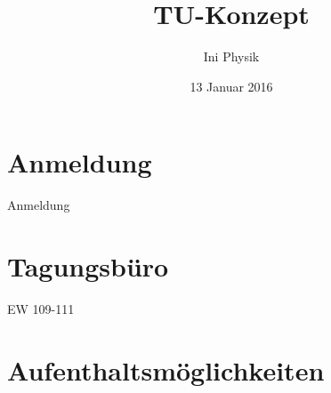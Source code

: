 \documentclass[compress,]{beamer}
\title[TU-Konzept]{TU-Konzept}
\author{Ini Physik}
\institute[TU Berlin]
\begin{document}
\subject{Konzept an der TU}
\date{13 Januar 2016}

\begin{frame}
\titlepage
\end{frame}


\frame{\tableofcontents}

\section{Anmeldung}
\begin{frame}{Anmeldung}
\end{frame}


\section{Tagungsbüro}
\begin{frame}{EW 109-111}
\end{frame}


\section{Aufenthaltsmöglichkeiten}
\begin{frame}
\end{frame}
\end{document}
